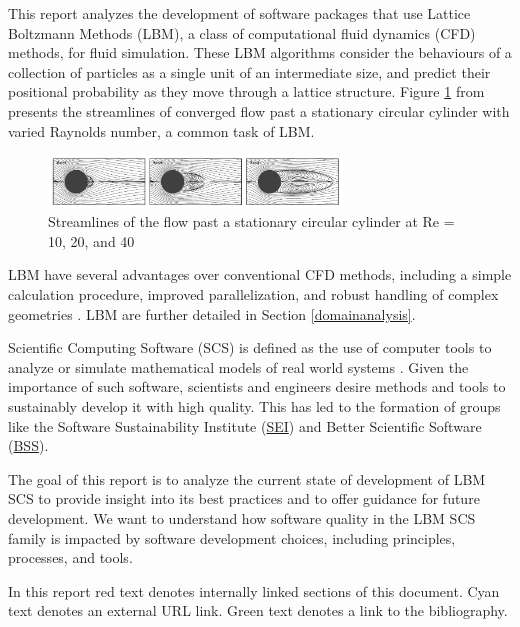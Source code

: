 \documentclass[12pt, notitlepage]{article}
\begin{document}
This report analyzes the development of software packages that use Lattice Boltzmann Methods (LBM), a class of computational fluid dynamics (CFD) methods, for fluid simulation. These LBM algorithms consider the behaviours of a collection of particles as a single unit of an intermediate size, and predict their positional probability as they move through a lattice structure. Figure \ref{circularflow} from \citep{chen2021phase} presents the streamlines of converged flow past a stationary circular cylinder with varied Raynolds number, a common task of LBM.

\begin{figure}[h!]
	\begin{center}
		\includegraphics[width=0.7\textwidth]{circularflow}
		\caption{Streamlines of the flow past a stationary circular cylinder at Re = 10, 20, and 40}
		\label{circularflow}
	\end{center}
\end{figure}

LBM have several advantages over conventional CFD methods, including a simple calculation procedure, improved parallelization, and robust handling of complex geometries \citep{ganji2015application}. LBM are further detailed in Section \ref{domainanalysis}. 

Scientific Computing Software (SCS) is defined as the use of computer tools to analyze or simulate mathematical models of real world systems \citep{smith2006systematic}. Given the importance of such software, scientists and engineers desire methods and tools to sustainably develop it with high quality. This has led to the formation of groups like the Software Sustainability Institute (\href{https://www.software.ac.uk/}{SEI}) and Better Scientific Software (\href{https://bssw.io/}{BSS}). 

The goal of this report is to analyze the current state of development of LBM SCS to provide insight into its best practices and to offer guidance for future development. We want to understand how software quality in the LBM SCS family is impacted by software development choices, including principles, processes, and tools.

In this report red text denotes internally linked sections of this document. Cyan text denotes an external URL link. Green text denotes a link to the bibliography.
\end{document}
